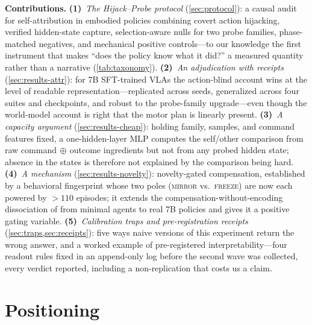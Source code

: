 \documentclass{article}
\begin{document}
\textbf{Contributions.}
\textbf{(1)}~\emph{The Hijack--Probe protocol} (\cref{sec:protocol}): a
causal audit for self-attribution in embodied policies combining covert
action hijacking, verified hidden-state capture, selection-aware nulls for
two probe families, phase-matched negatives, and mechanical positive
controls---to our knowledge the first instrument that makes ``does the
policy know what it did?'' a measured quantity rather than a narrative
(\cref{tab:taxonomy}).
\textbf{(2)}~\emph{An adjudication with receipts} (\cref{sec:results-attr}):
for 7B SFT-trained VLAs the action-blind account wins at the level of
readable representation---replicated across seeds, generalized across four
suites and checkpoints, and robust to the probe-family upgrade---even though
the world-model account is right that the motor plan is linearly present.
\textbf{(3)}~\emph{A capacity argument} (\cref{sec:results-cheap}): holding
family, samples, and command features fixed, a one-hidden-layer MLP computes
the self/other comparison from raw command$\,\oplus\,$outcome ingredients
but not from any probed hidden state; absence in the states is therefore not
explained by the comparison being hard.
\textbf{(4)}~\emph{A mechanism} (\cref{sec:results-novelty}):
novelty-gated compensation, established by a behavioral fingerprint whose
two poles (\textsc{mirror} vs.\ \textsc{freeze}) are now each powered by
${>}110$ episodes; it extends the compensation-without-encoding dissociation
of \citet{ye2026prediction} from minimal agents to real 7B policies and
gives it a positive gating variable.
\textbf{(5)}~\emph{Calibration traps and pre-registration receipts}
(\cref{sec:traps,sec:receipts}): five ways naive versions of this experiment
return the wrong answer, and a worked example of pre-registered
interpretability---four readout rules fixed in an append-only log before the
second wave was collected, every verdict reported, including a
non-replication that costs us a claim.

\section{Positioning}
\label{sec:related}
\end{document}
